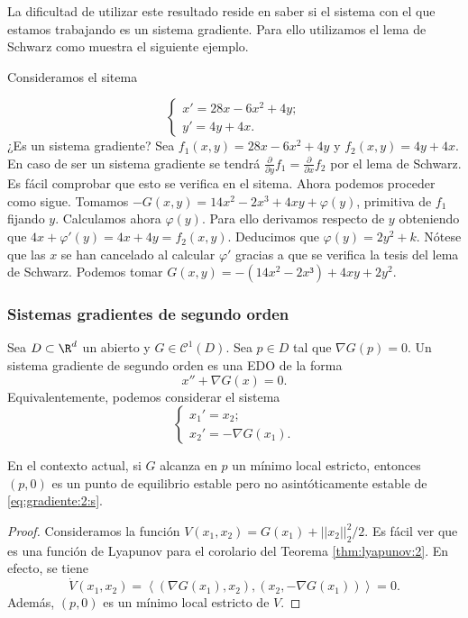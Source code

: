 La dificultad de utilizar este resultado reside en saber si el sistema con el que estamos trabajando
es un sistema gradiente. Para ello utilizamos el lema de Schwarz como muestra el siguiente ejemplo.

\begin{ex}
  Consideramos el sitema
  
  \begin{equation}
    \label{eq:schwarz}
    \begin{cases}
      x' = 28x - 6x^2 + 4y; \\
      y' = 4y +4x.
    \end{cases}
  \end{equation}
  ¿Es un sistema gradiente? Sea $f_1(x,y) = 28x - 6x^2 + 4y$ y $f_2(x,y) = 4y +4x$. En caso de ser
  un sistema gradiente se tendrá $\frac{\partial}{\partial y} f_1 = \frac{\partial}{\partial x} f_2$
  por el lema de Schwarz. Es fácil comprobar que esto se verifica en el sitema. Ahora podemos
  proceder como sigue. Tomamos $-G(x,y) = 14x^2 - 2x^3 + 4xy + \varphi(y)$, primitiva de $f_1$
  fijando $y$. Calculamos ahora $\varphi(y)$. Para ello derivamos respecto de $y$ obteniendo que
  $4x + \varphi'(y) = 4x+4y = f_2(x,y)$. Deducimos que $\varphi(y) = 2y^2 + k$. Nótese que las $x$
  se han cancelado al calcular $\varphi'$ gracias a que se verifica la tesis del lema de
  Schwarz. Podemos tomar $G(x,y) = - (14x^2-2x³)+4xy+2y^2$.
\end{ex}

\subsubsection{Sistemas gradientes de segundo orden}

Sea $D \subset \R^d$ un abierto y $G \in \mathcal{C}^1(D)$. Sea $p \in D$ tal que $\nabla G(p) =
0$. Un sistema gradiente de segundo orden es una EDO de la forma
\begin{equation}
  \label{eq:gradiente:2}
  x'' + \nabla G(x) = 0.
  \tag{G2}
\end{equation}
Equivalentemente, podemos considerar el sistema
\begin{equation}
  \label{eq:gradiente:2:s}
  \begin{cases}
    x_1' = x_2; \\
    x_2' = - \nabla G(x_1).
  \end{cases}
  \tag{G2S}
\end{equation}

\begin{theorem}
  \label{thm:lagrange-dirichlet}
  En el contexto actual, si $G$ alcanza en $p$ un mínimo local estricto, entonces $(p,0)$ es un
  punto de equilibrio estable pero no asintóticamente estable de \eqref{eq:gradiente:2:s}.
\end{theorem}
\begin{proof}
  Consideramos la función $V(x_1, x_2) = G(x_1) + ||x_2||_2^2 / 2$. Es fácil ver que es una función
  de Lyapunov para el corolario del Teorema \ref{thm:lyapunov:2}. En efecto, se tiene
  \[\dot{V}(x_1, x_2) = \left\langle(\nabla G(x_1), x_2), (x_2, -\nabla G(x_1)) \right\rangle = 0.\]
  Además, $(p,0)$ es un mínimo local estricto de $V$.
\end{proof}


